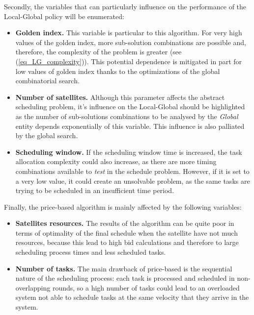 Secondly, the variables that can particularly influence on the performance of the Local-Global policy will be enumerated:

\begin{itemize}
\item \textbf{Golden index.} This variable is particular to this algorithm. For very high values of the golden index, more sub-solution combinations are possible and, therefore, the complexity of the problem is greater (see (\ref{eq_LG_complexity})). This potential dependence is mitigated in part for low values of golden index thanks to the optimizations of the global combinatorial search.

\item \textbf{Number of satellites.} Although this parameter affects the abstract scheduling problem, it's influence on the Local-Global should be highlighted as the number of sub-solutions combinations to be analysed by the \emph{Global} entity depends exponentially of this variable. This influence is also palliated by the global search.

\item \textbf{Scheduling window.} If the scheduling window time is increased, the task allocation complexity could also increase, as there are more timing combinations available to \emph{test} in the schedule problem. However, if it is set to a very low value, it could create an unsolvable problem, as the same tasks are trying to be scheduled in an insufficient time period.
\end{itemize}

Finally, the price-based algorithm is mainly affected by the following variables:

\begin{itemize}
\item \textbf{Satellites resources.} The results of the algorithm can be quite poor in terms of optimality of the final schedule when the satellite have not much resources, because this lead to high bid calculations and therefore to large scheduling process times and less scheduled tasks.

\item \textbf{Number of tasks.} The main drawback of price-based is the sequential nature of the scheduling process: each task is processed and scheduled in non-overlapping rounds, so a high number of tasks could lead to an overloaded system not able to schedule tasks at the same velocity that they arrive in the system.
\end{itemize}

